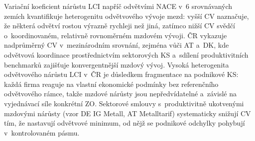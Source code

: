 Variační koeficient nárůstu \ac{LCI} napříč odvětvími \ac{NACE} v~6 srovnávaných zemích kvantifikuje heterogenitu odvětvového vývoje mezd: vyšší CV naznačuje, že některá odvětví rostou výrazně rychleji než jiná, zatímco nižší CV svědčí o~koordinovaném, relativně rovnoměrném mzdovém vývoji.
ČR vykazuje nadprůměrný CV v~mezinárodním srovnání, zejména vůči AT a~DK, kde odvětvová koordinace prostřednictvím sektorových \ac{KS} a~sdílení produktivitních benchmarků zajišťuje konvergentnější mzdový vývoj.
Vysoká heterogenita odvětvového nárůstu \ac{LCI} v~ČR je důsledkem fragmentace na podnikové \ac{KS}: každá firma reaguje na vlastní ekonomické podmínky bez referenčního odvětvového rámce, takže mzdové nárůsty jsou nepředvídatelné a~závislé na vyjednávací síle konkrétní \ac{ZO}.
Sektorové smlouvy s~produktivitně ukotvenými mzdovými nárůsty (vzor DE IG Metall, AT Metalltarif) systematicky snižují CV tím, že nastavují odvětvové minimum, od nějž se podnikové odchylky pohybují v~kontrolovaném pásmu.


